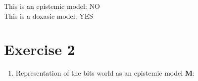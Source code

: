 \documentclass[leqno]{article}
\begin{document}
\begin{enumerate}
    This is an epistemic model: NO \\
    This is a doxasic model: YES \\

\end{enumerate}


\section*{Exercise 2}

\begin{enumerate}

    \item Representation of the bits world as an epistemic model \textbf{M}: \\


\end{enumerate}
\end{document}
